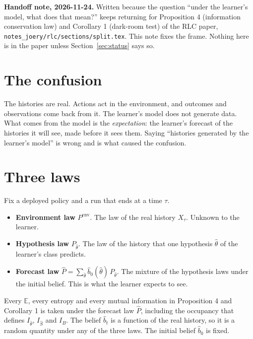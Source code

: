 \documentclass[10pt]{article}
\newcommand{\E}{\mathbb E}
\begin{document}
\noindent\textbf{Handoff note, 2026-11-24.}
Written because the question ``under the learner's model, what does that mean?'' keeps returning for Proposition 4 (information conservation law) and Corollary 1 (dark-room test) of the RLC paper, \texttt{notes\_joery/rlc/sections/split.tex}.
This note fixes the frame.
Nothing here is in the paper unless Section~\ref{sec:status} says so.

\section{The confusion}
The histories are real.
Actions act in the environment, and outcomes and observations come back from it.
The learner's model does not generate data.
What comes from the model is the \emph{expectation}: the learner's forecast of the histories it will see, made before it sees them.
Saying ``histories generated by the learner's model'' is wrong and is what caused the confusion.

\section{Three laws}
Fix a deployed policy and a run that ends at a time $\tau$.
\begin{itemize}
  \item \textbf{Environment law} $P^{\mathrm{env}}$. The law of the real history $X_\tau$. Unknown to the learner.
  \item \textbf{Hypothesis law} $P_{\hat\theta}$. The law of the history that one hypothesis $\hat\theta$ of the learner's class predicts.
  \item \textbf{Forecast law} $\hat P = \sum_{\hat\theta} \hat b_0(\hat\theta)\, P_{\hat\theta}$. The mixture of the hypothesis laws under the initial belief. This is what the learner expects to see.
\end{itemize}
Every $\E$, every entropy and every mutual information in Proposition 4 and Corollary 1 is taken under the forecast law $\hat P$, including the occupancy that defines $I_{\hat\theta}$, $I_{\hat S}$ and $I_B$.
The belief $\hat b_t$ is a function of the real history, so it is a random quantity under any of the three laws.
The initial belief $\hat b_0$ is fixed.
\end{document}

